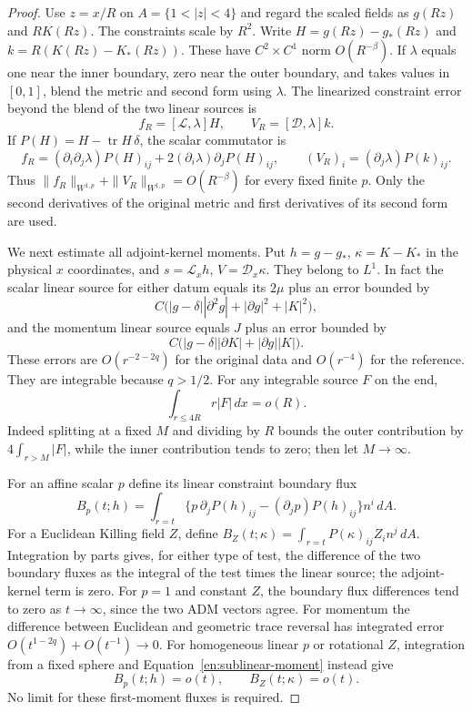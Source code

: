 \begin{proof}
Use $z=x/R$ on $A=\{1<|z|<4\}$ and regard the scaled fields as
$g(Rz)$ and $RK(Rz)$. The constraints scale by $R^2$. Write
$H=g(Rz)-g_*(Rz)$ and $k=R(K(Rz)-K_*(Rz))$. These have
$C^2\times C^1$ norm $O(R^{-\beta})$. If $\lambda$ equals one
near the inner boundary, zero near the outer boundary, and takes
values in $[0,1]$, blend the metric and second form using $\lambda$.
The linearized constraint error beyond the blend of the two linear
sources is
\[
 f_R=[\mathcal L,\lambda]H,\qquad V_R=[\mathcal D,\lambda]k.
\]
If $P(H)=H-\operatorname{tr}H\,\delta$, the scalar commutator is
\begin{equation}\label{en:commutator-orders}
 f_R=(\partial_i\partial_j\lambda)P(H)_{ij}
           +2(\partial_i\lambda)\partial_jP(H)_{ij},
 \qquad
 (V_R)_i=(\partial_j\lambda)P(k)_{ij}.
\end{equation}
Thus $\|f_R\|_{W^{1,p}}+\|V_R\|_{W^{1,p}}=O(R^{-\beta})$
for every fixed finite $p$. Only the second derivatives of the
original metric and first derivatives of its second form are used.

We next estimate all adjoint-kernel moments. Put
$h=g-g_*$, $\kappa=K-K_*$ in the physical $x$ coordinates, and
$s=\mathcal L_xh$, $V=\mathcal D_x\kappa$. They belong to $L^1$.
In fact the scalar linear source for either datum equals its
$2\mu$ plus an error bounded by
\[
 C\bigl(|g-\delta||\partial^2g|+|\partial g|^2+|K|^2\bigr),
\]
and the momentum linear source equals $J$ plus an error bounded by
\[
 C\bigl(|g-\delta||\partial K|+|\partial g||K|\bigr).
\]
These errors are $O(r^{-2-2q})$ for the original data and
$O(r^{-4})$ for the reference. They are integrable because $q>1/2$.
For any integrable source $F$ on the end,
\begin{equation}\label{en:sublinear-moment}
 \int_{r\leq4R}r|F|\,dx=o(R).
\end{equation}
Indeed splitting at a fixed $M$ and dividing by $R$ bounds the
outer contribution by $4\int_{r>M}|F|$, while the inner contribution
tends to zero; then let $M\to\infty$.

For an affine scalar $p$ define its linear constraint boundary flux
\[
 B_p(t;h)=\int_{r=t}
  \{p\,\partial_jP(h)_{ij}-(\partial_jp)P(h)_{ij}\}
          n^i\,dA.
\]
For a Euclidean Killing field $Z$, define
$B_Z(t;\kappa)=\int_{r=t}P(\kappa)_{ij}Z_i n^j\,dA$.
Integration by parts gives, for either type of test, the difference
of the two boundary fluxes as the integral of the test times the
linear source; the adjoint-kernel term is zero. For $p=1$ and
constant $Z$, the boundary flux differences tend to zero as
$t\to\infty$, since the two ADM vectors agree. For momentum the
difference between Euclidean and geometric trace reversal has
integrated error $O(t^{1-2q})+O(t^{-1})\to0$.
For homogeneous linear $p$ or rotational $Z$, integration from a
fixed sphere and Equation~\ref{en:sublinear-moment} instead give
\begin{equation}\label{en:first-moment-flux}
 B_p(t;h)=o(t),\qquad B_Z(t;\kappa)=o(t).
\end{equation}
No limit for these first-moment fluxes is required.


\end{proof}
